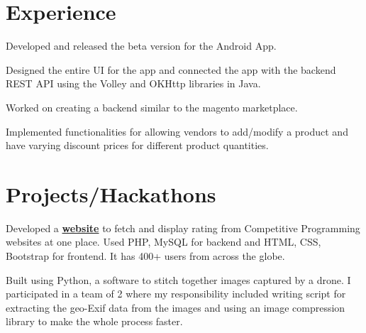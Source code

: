 \documentclass[]{deedy-resume-openfont}
\begin{document}
\begin{minipage}[t]{0.66\textwidth} 


\section{Experience}

\vspace{\topsep} %
\begin{tightemize}
\item Developed and released the beta version for the Android App.
\item Designed the entire UI for the app and connected the app with the backend REST API using the Volley and OKHttp libraries in Java.
\end{tightemize}
\sectionsep

\begin{tightemize}
\item Worked on creating a backend similar to the magento marketplace.
\item Implemented functionalities for allowing vendors to add/modify a product and have varying discount prices for different product quantities.
\end{tightemize}
\sectionsep


\section{Projects/Hackathons}
\href{https://databread.xyz}{}
Developed a \textbf{\href{https://databread.xyz/}{website}} to fetch and display rating from Competitive Programming websites at one place. Used PHP, MySQL for backend and HTML, CSS, Bootstrap for frontend. It has 400+ users from across the globe.

\sectionsep

\href{https://github.com/Shraeyas/Drone-Image-Stitching}{}
Built using Python, a software to stitch together images captured by a drone. I participated in a team of 2 where my responsibility included writing script for extracting the geo-Exif data from the images and using an image compression library to make the whole process faster.


\end{minipage}
\end{document}
